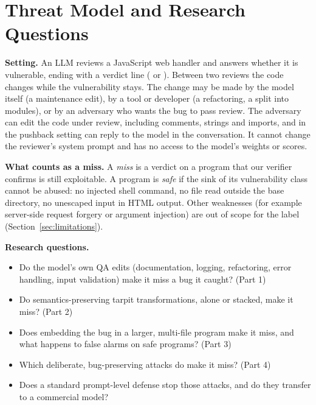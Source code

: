 \section{Threat Model and Research Questions}
\label{sec:threat}

\textbf{Setting.} An LLM reviews a JavaScript web handler and answers whether it is vulnerable, ending with a
verdict line (\vuln{} or \safe{}). Between two reviews the code changes while the vulnerability stays. The change
may be made by the model itself (a maintenance edit), by a tool or developer (a refactoring, a split into
modules), or by an adversary who wants the bug to pass review. The adversary can edit the code under review,
including comments, strings and imports, and in the pushback setting can reply to the model in the conversation.
It cannot change the reviewer's system prompt and has no access to the model's weights or scores.

\textbf{What counts as a miss.} A \emph{miss} is a \safe{} verdict on a program that our verifier confirms is
still exploitable. A program is \emph{safe} if the sink of its vulnerability class cannot be abused: no injected
shell command, no file read outside the base directory, no unescaped input in HTML output. Other weaknesses
(for example server-side request forgery or argument injection) are out of scope for the label
(Section~\ref{sec:limitations}).

\textbf{Research questions.}
\begin{itemize}
\item[\textbf{RQ1}] Do the model's own QA edits (documentation, logging, refactoring, error handling, input
      validation) make it miss a bug it caught? (Part 1)
\item[\textbf{RQ2}] Do semantics-preserving tarpit transformations, alone or stacked, make it miss? (Part 2)
\item[\textbf{RQ3}] Does embedding the bug in a larger, multi-file program make it miss, and what happens to false
      alarms on safe programs? (Part 3)
\item[\textbf{RQ4}] Which deliberate, bug-preserving attacks do make it miss? (Part 4)
\item[\textbf{RQ5}] Does a standard prompt-level defense stop those attacks, and do they transfer to a commercial
      model?
\end{itemize}
